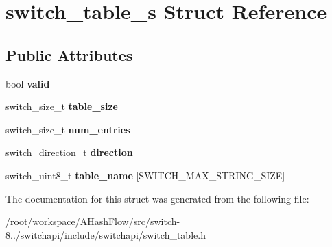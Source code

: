 \hypertarget{structswitch__table__s}{\section{switch\+\_\+table\+\_\+s Struct Reference}
\label{structswitch__table__s}
}
\subsection*{Public Attributes}
\begin{DoxyCompactItemize}
\item 
\hypertarget{structswitch__table__s_a740ab3d889eb31402fb987ac41013405}{bool {\bfseries valid}}\label{structswitch__table__s_a740ab3d889eb31402fb987ac41013405}

\item 
\hypertarget{structswitch__table__s_a530c50f85703373f9ddc3897737a340c}{switch\+\_\+size\+\_\+t {\bfseries table\+\_\+size}}\label{structswitch__table__s_a530c50f85703373f9ddc3897737a340c}

\item 
\hypertarget{structswitch__table__s_a85f5b69cbcf4215abcef8d77d9b4cdca}{switch\+\_\+size\+\_\+t {\bfseries num\+\_\+entries}}\label{structswitch__table__s_a85f5b69cbcf4215abcef8d77d9b4cdca}

\item 
\hypertarget{structswitch__table__s_aeaeb2544f96f8b16fedb9d9046028564}{switch\+\_\+direction\+\_\+t {\bfseries direction}}\label{structswitch__table__s_aeaeb2544f96f8b16fedb9d9046028564}

\item 
\hypertarget{structswitch__table__s_a3b4f0d1344e92ce74ac00555b934c2d4}{switch\+\_\+uint8\+\_\+t {\bfseries table\+\_\+name} \mbox{[}S\+W\+I\+T\+C\+H\+\_\+\+M\+A\+X\+\_\+\+S\+T\+R\+I\+N\+G\+\_\+\+S\+I\+Z\+E\mbox{]}}\label{structswitch__table__s_a3b4f0d1344e92ce74ac00555b934c2d4}

\end{DoxyCompactItemize}


The documentation for this struct was generated from the following file\+:\begin{DoxyCompactItemize}
\item 
/root/workspace/\+A\+Hash\+Flow/src/switch-\/8../switchapi/include/switchapi/switch\+\_\+table.\+h\end{DoxyCompactItemize}
